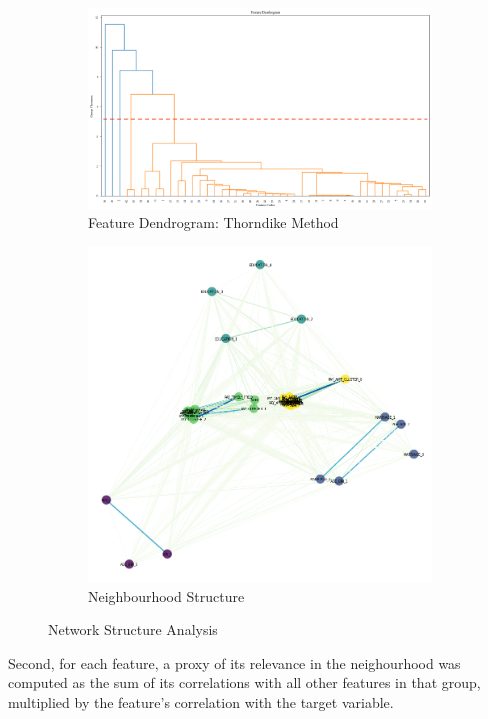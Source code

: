 \documentclass{article}
\newcommand{\code}{\texttt}
\begin{document}
\begin{figure}[ht]
	\centering
	\begin{subfigure}{.5\textwidth}
		\centering
		\includegraphics[width=.8\linewidth]{dendrogram}
		\caption{Feature Dendrogram: Thorndike Method}
		\label{fig:dendrogram}
	\end{subfigure}%
	\begin{subfigure}{.5\textwidth}
		\centering
		\includegraphics[scale=0.25]{nbr_graph}
		\caption{Neighbourhood Structure}
		\label{fig:nbr_graph}
	\end{subfigure}
	\caption{Network Structure Analysis}
	\label{fig:nbr_structure}
\end{figure}
Second, for each feature, a proxy of its relevance in the neighourhood was computed as the sum of its correlations with all other features in that group, multiplied by the feature's correlation with the target variable.
\end{document}
